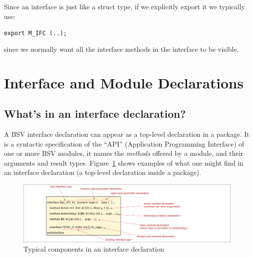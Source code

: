 Since an interface is just like a struct type, if we explicitly export
it we typically use:

\begin{center}
\mbox{\tt export M\_IFC (..);}
\end{center}

since we normally want all the interface methods in the interface to
be visible.


\section{Interface and Module Declarations}

\label{Sec_Interface_and_Module_decls}



\subsection{What's in an interface declaration?}

\label{Sec_Whats_in_an_interface_declaration}


A BSV interface declaration can appear as a top-level declaration in a
package.  It is a syntactic specification of the ``API'' (Application
Programming Interface) of one or more BSV modules, {\ie} it names the
\emph{methods} offered by a module, and their arguments and result
types.  Figure~\ref{Fig_BSV_whats_in_an_interface_decl} shows examples
of what one might find in an interface declaration (a top-level
declaration inside a package).
\begin{figure}[htbp]
  \centerline{\includegraphics[width=6in,angle=0]{Figures/Fig_BSV_whats_in_an_interface_decl}}
  \caption{\label{Fig_BSV_whats_in_an_interface_decl}
           Typical components in an interface declaration}
\end{figure}

